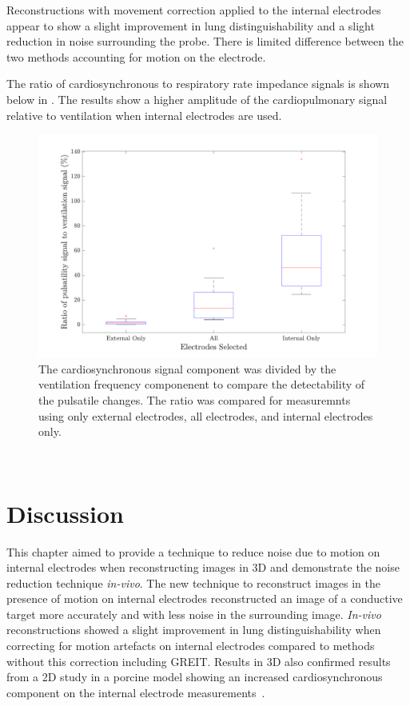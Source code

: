 Reconstructions with movement correction applied to the internal electrodes appear to show a 
slight improvement in lung distinguishability and a slight reduction
in noise surrounding the probe. There is limited difference between the
two methods accounting for motion on the electrode.

The ratio of cardiosynchronous to respiratory rate impedance signals is shown below in 
. The results show a higher amplitude of the cardiopulmonary 
signal relative to ventilation when internal electrodes are used.

\begin{figure}
    \centering
	\includegraphics[width=\textwidth]{chapter7-internal_elec_motion/imgs/amplitude_ratio.pdf} 
	\caption[Results of the probe location correction]{\label{fig:amplitude_ratio} 
	The cardiosynchronous signal component was divided by the ventilation frequency 
	componenent to compare the detectability of the pulsatile changes. The ratio was compared 
	for measuremnts using only external electrodes, all electrodes, and internal electrodes only.}
\end{figure}~

\section{Discussion}

This chapter aimed to provide a technique to reduce noise due to motion on internal
electrodes when reconstructing images in 3D and demonstrate the noise reduction technique
\emph{in-vivo}. The new technique to reconstruct images in the presence of motion 
on internal electrodes reconstructed an image of a conductive target 
more accurately and with less noise in the surrounding image. \emph{In-vivo}
reconstructions showed a slight improvement in lung distinguishability when correcting
for motion artefacts on internal electrodes compared to methods without this correction 
including GREIT. Results in 3D also confirmed results from a 2D study in a porcine 
model showing an increased cardiosynchronous component on the internal electrode 
measurements~\parencite{czaplik_application_2014}.


